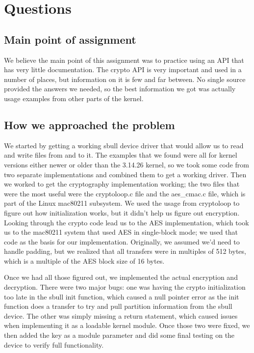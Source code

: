 \documentclass[10pt,onecolumn,journal,draftclsnofoot,letterpaper]{IEEEtran}
\begin{document}
\section{Questions}

\subsection{Main point of assignment}
We believe the main point of this assignment was to practice using an API that has very little documentation. The crypto API is very important and used in a number of places, but information on it is few and far between. No single source provided the answers we needed, so the best information we got was actually usage examples from other parts of the kernel. 

\subsection{How we approached the problem}
We started by getting a working sbull device driver that would allow us to read and write files from and to it. The examples that we found were all for kernel versions either newer or older than the 3.14.26 kernel, so we took some code from two separate implementations and combined them to get a working driver. Then we worked to get the cryptography implementation working; the two files that were the most useful were the cryptoloop.c file and the aes\_cmac.c file, which is part of the Linux mac80211 subsystem. We used the usage from cryptoloop to figure out how initialization works, but it didn't help us figure out encryption. Looking through the crypto code lead us to the AES implementation, which took us to the mac80211 system that used AES in single-block mode; we used that code as the basis for our implementation. Originally, we assumed we'd need to handle padding, but we realized that all transfers were in multiples of 512 bytes, which is a multiple of the AES block size of 16 bytes.

Once we had all those figured out, we implemented the actual encryption and decryption. There were two major bugs: one was having the crypto initialization too late in the sbull init function, which caused a null pointer error as the init function does a transfer to try and pull partition information from the sbull device. The other was simply missing a return statement, which caused issues when implementing it as a loadable kernel module. Once those two were fixed, we then added the key as a module parameter and did some final testing on the device to verify full functionality.
\end{document}
